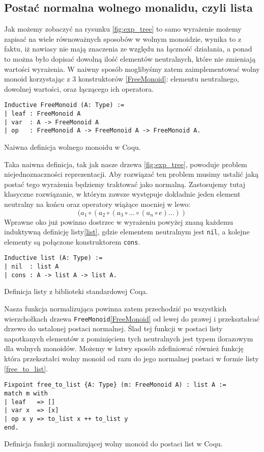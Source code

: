 \subsection{Postać normalna wolnego monalidu, czyli lista}
Jak możemy zobaczyć na rysunku \ref{fig:exp_tree} to samo wyrażenie możemy zapisać na wiele równoważnych sposobów w wolnym monoidzie, wynika to z faktu, iż nawiasy nie mają znaczenia ze względu na łączność działania, a ponad to można było dopisać dowolną ilość elementów neutralnych, które nie zmieniają wartości wyrażenia. W naiwny sposób moglibyśmy zatem zaimplementować wolny monoid korzystając z 3 konstruktorów \ref{FreeMonoid}: elementu neutralnego, dowolnej wartości, oraz łączącego ich operatora.
\begin{code}
\begin{verbatim}
Inductive FreeMonoid (A: Type) :=
| leaf : FreeMonoid A
| var  : A -> FreeMonoid A
| op   : FreeMonoid A -> FreeMonoid A -> FreeMonoid A.
\end{verbatim}
\caption{Naiwna definicja wolnego monoidu w Coqu.}
\label{FreeMonoid}
\end{code}
Taka naiwna definicja, tak jak nasze drzewa \ref{fig:exp_tree}, powoduje problem niejednoznaczności reprezentacji. Aby rozwiązać ten problem musimy ustalić jaką postać tego wyrażenia będziemy traktować jako normalną. Zastosujemy tutaj klasyczne rozwiązanie, w którym zawsze występuje dokładnie jeden element neutralny na końcu oraz operatory wiążące mocniej w lewo:
$$
    (a_1 \circ (a_2 \circ (a_3 \circ \dots  \circ (a_n \circ e) \dots ))
$$
Wprawne oko już powinno dostrzec w wyrażeniu powyżej znaną każdemu induktywną definicję listy\ref{list}, gdzie elementem neutralnym jest \texttt{nil}, a kolejne elementy są połączone konstruktorem \texttt{cons}.
\begin{code}
\begin{verbatim}
Inductive list (A: Type) :=
| nil  : list A
| cons : A -> list A -> list A.
\end{verbatim}
\caption{Definicja listy z biblioteki standardowej Coqa.}
\label{list}
\end{code}
Nasza funkcja normalizująca powinna zatem przechodzić po wszystkich wierzchołkach drzewa \texttt{FreeMonoid}\ref{FreeMonoid} od lewej do prawej i przekształcać drzewo do ustalonej postaci normalnej. Ślad tej funkcji w postaci listy napotkanych elementów z pominięciem tych neutralnych jest typem ilorazowym dla wolnych monoidów. Możemy w łatwy sposób zdefiniować również funkcję która przekształci wolny monoid od razu do jego normalnej postaci w formie listy \ref{free_to_list}.
\begin{code}
\begin{verbatim}
Fixpoint free_to_list {A: Type} (m: FreeMonoid A) : list A :=
match m with
| leaf   => []
| var x  => [x]
| op x y => to_list x ++ to_list y
end.
\end{verbatim}
\caption{Definicja funkcji normalizującej wolny monoid do postaci list w Coqu.}
\label{free_to_list}
\end{code}
